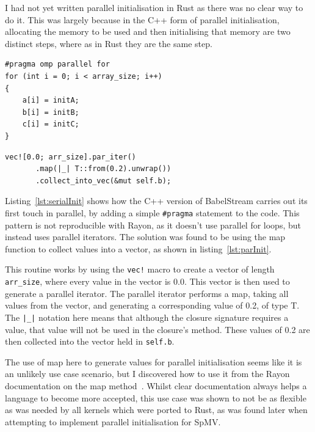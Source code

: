 I had not yet written parallel initialisation in Rust as there was no clear way to do it. This was largely because in the C++ form of parallel initialisation, allocating the memory to be used and then initialising that memory are two distinct steps, where as in Rust they are the same step.

\noindent\begin{minipage}{.49\textwidth}
\begin{code}
\begin{verbatim}
#pragma omp parallel for
for (int i = 0; i < array_size; i++)
{
    a[i] = initA;
    b[i] = initB;
    c[i] = initC;
}
\end{verbatim}
\label{lst:serialInit}
\end{code}
\end{minipage}\hfill
\begin{minipage}{.49\textwidth}
\begin{code}
\begin{verbatim}
vec![0.0; arr_size].par_iter()
       .map(|_| T::from(0.2).unwrap())
       .collect_into_vec(&mut self.b);
\end{verbatim}
\label{lst:parInit}
\end{code}
\end{minipage}

Listing~\ref{lst:serialInit} shows how the C++ version of BabelStream carries out its first touch in parallel, by adding a simple \texttt{\#pragma} statement to the code. This pattern is not reproducible with Rayon, as it doesn't use parallel for loops, but instead uses parallel iterators. The solution was found to be using the map function to collect values into a vector, as shown in listing~\ref{lst:parInit}.

This routine works by using the \texttt{vec!} macro to create a vector of length \texttt{arr\_size}, where every value in the vector is 0.0. This vector is then used to generate a parallel iterator. The parallel iterator performs a map, taking all values from the vector, and generating a corresponding value of 0.2, of type T. The \texttt{|\_|} notation here means that although the closure signature requires a value, that value will not be used in the closure's method.
These values of 0.2 are then collected into the vector held in \texttt{self.b}.

The use of map here to generate values for parallel initialisation seems like it is an unlikely use case scenario, but I discovered how to use it from the Rayon documentation on the map method~\cite{rayonIter}. Whilst clear documentation always helps a language to become more accepted, this use case was shown to not be as flexible as was needed by all kernels which were ported to Rust, as was found later when attempting to implement parallel initialisation for SpMV.

